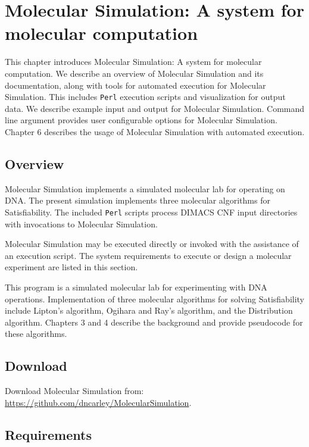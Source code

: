 \chapter{Molecular Simulation: A system for molecular computation}


This chapter introduces Molecular Simulation: A system for molecular computation.  We describe an overview of Molecular Simulation and its documentation, along with tools for automated execution for Molecular Simulation.  This includes \texttt{Perl} execution scripts and visualization for output data.  We describe example input and output for Molecular Simulation.  Command line argument provides user configurable options for Molecular Simulation.  Chapter 6 describes the usage of Molecular Simulation with automated execution.
	
	\section{Overview}
	

Molecular Simulation implements a simulated molecular lab for operating on DNA.  The present simulation implements three molecular algorithms for {\sc Satisfiability}.  The included \texttt{Perl} scripts process DIMACS CNF input directories with invocations to Molecular Simulation.

Molecular Simulation may be executed directly or invoked with the assistance of an execution script.  The system requirements to execute or design a molecular experiment are listed in this section.  
		
This program is a simulated molecular lab for experimenting with DNA operations. Implementation of three molecular algorithms for solving {\sc Satisfiability} include Lipton's algorithm, Ogihara and Ray's algorithm, and the Distribution algorithm.  Chapters 3 and 4 describe the background and provide pseudocode for these algorithms.		

	\section{Download}
	\noindent Download Molecular Simulation from: \url{https://github.com/dncarley/MolecularSimulation}. 
	
 	\section{Requirements}
 	
